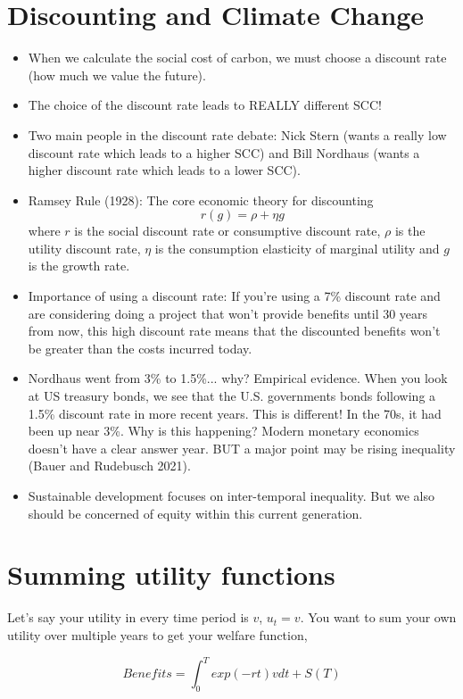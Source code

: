 \documentclass{article}
\begin{document}
\section{Discounting and Climate Change}
\begin{itemize}
    \item When we calculate the social cost of carbon, we must choose a discount rate (how much we value the future). 
    \item The choice of the discount rate leads to REALLY different SCC! 
    \item Two main people in the discount rate debate: Nick Stern (wants a really low discount rate which leads to a higher SCC) and Bill Nordhaus (wants a higher discount rate which leads to a lower SCC). 
    \item Ramsey Rule (1928): The core economic theory for discounting 
    $$r(g) = \rho + \eta g$$
    where $r$ is the social discount rate or consumptive discount rate, $\rho$ is the utility discount rate, $\eta$ is the consumption elasticity of marginal utility and $g$ is the growth rate.
    \item Importance of using a discount rate: If you're using a 7\% discount rate and are considering doing a project that won't provide benefits until 30 years from now, this high discount rate means that the discounted benefits won't be greater than the costs incurred today.
    \item Nordhaus went from 3\% to 1.5\%... why? Empirical evidence. When you look at US treasury bonds, we see that the U.S. governments bonds following a 1.5\% discount rate in more recent years. This is different! In the 70s, it had been up near 3\%. Why is this happening? Modern monetary economics doesn't have a clear answer year. BUT a major point may be rising inequality (Bauer and Rudebusch 2021). 
    \item Sustainable development focuses on inter-temporal inequality. But we also should be concerned of equity within this current generation. 
    
\end{itemize}

\section{Summing utility functions}
Let's say your utility in every time period is $v$, $u_t = v$. You want to sum your own utility over multiple years to get your welfare function, 

$$ Benefits = \int_0^T exp(-rt) v dt + S(T)$$
\end{document}
